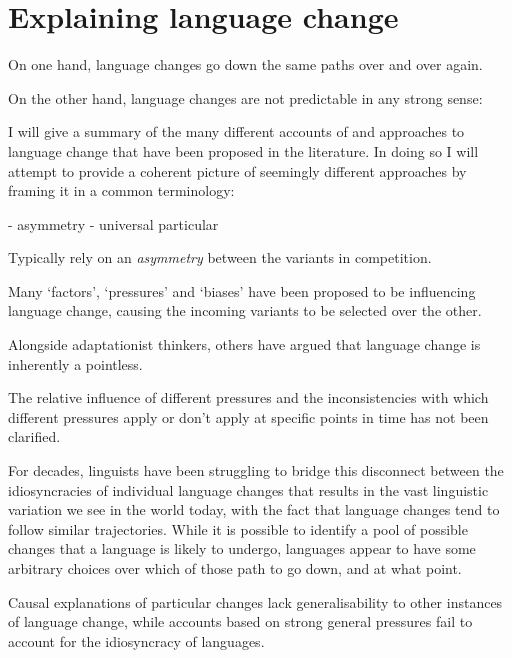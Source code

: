 \section{Explaining language change}

On one hand, language changes go down the same paths over and over again.

On the other hand, language changes are not predictable in any strong sense:


I will give a summary of the many different accounts of and approaches to language change that have been proposed in the literature. In doing so I will attempt to provide a coherent picture of seemingly different approaches by framing it in a common terminology:

- asymmetry
- universal particular


Typically rely on an \emph{asymmetry} between the variants in competition.

Many `factors', `pressures' and `biases' have been proposed to be influencing language change, causing the incoming variants to be selected over the other.


Alongside adaptationist thinkers, others have argued that language change is inherently a pointless.

The relative influence of different pressures and the inconsistencies with which different pressures apply or don't apply at specific points in time has not been clarified.

For decades, linguists have been struggling to bridge this disconnect between the idiosyncracies of individual language changes that results in the vast linguistic variation we see in the world today, with the fact that language changes tend to follow similar trajectories.
While it is possible to identify a pool of possible changes that a language is likely to undergo, languages appear to have some arbitrary choices over which of those path to go down, and at what point.

Causal explanations of particular changes lack generalisability to other instances of language change, while accounts based on strong general pressures fail to account for the idiosyncracy of languages.

